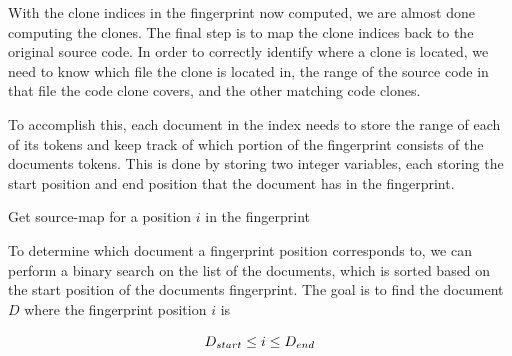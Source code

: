 With the clone indices in the fingerprint now computed, we are almost done computing the
clones. The final step is to map the clone indices back to the original source code. In
order to correctly identify where a clone is located, we need to know which file the clone
is located in, the range of the source code in that file the code clone covers, and the
other matching code clones.

To accomplish this, each document in the index needs to store the range of each of its
tokens and keep track of which portion of the fingerprint consists of the documents
tokens. This is done by storing two integer variables, each storing the start position and
end position that the document has in the fingerprint. 

\begin{algorithm}[t]
  \SetAlgoLined\DontPrintSemicolon

  \vspace{0.5cm}
  \caption{Get source-map for a position $i$ in the fingerprint}
  \label{alg:sourcemap}
\end{algorithm}

To determine which document a fingerprint position corresponds to, we can perform a binary
search on the list of the documents, which is sorted based on the start position of the
documents fingerprint. The goal is to find the document $D$ where the fingerprint position $i$
is 

$$
{{D}_{start}} \leq i \leq {{D}_{end}}
$$

